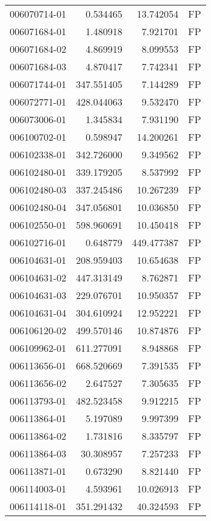 \begin{tabular}{lrrl}
006070714-01 &    0.534465 &    13.742054 &   FP \\
006071684-01 &    1.480918 &     7.921701 &   FP \\
006071684-02 &    4.869919 &     8.099553 &   FP \\
006071684-03 &    4.870417 &     7.742341 &   FP \\
006071744-01 &  347.551405 &     7.144289 &   FP \\
006072771-01 &  428.044063 &     9.532470 &   FP \\
006073006-01 &    1.345834 &     7.931190 &   FP \\
006100702-01 &    0.598947 &    14.200261 &   FP \\
006102338-01 &  342.726000 &     9.349562 &   FP \\
006102480-01 &  339.179205 &     8.537992 &   FP \\
006102480-03 &  337.245486 &    10.267239 &   FP \\
006102480-04 &  347.056801 &    10.036850 &   FP \\
006102550-01 &  598.960691 &    10.450418 &   FP \\
006102716-01 &    0.648779 &   449.477387 &   FP \\
006104631-01 &  208.959403 &    10.654638 &   FP \\
006104631-02 &  447.313149 &     8.762871 &   FP \\
006104631-03 &  229.076701 &    10.950357 &   FP \\
006104631-04 &  304.610924 &    12.952221 &   FP \\
006106120-02 &  499.570146 &    10.874876 &   FP \\
006109962-01 &  611.277091 &     8.948868 &   FP \\
006113656-01 &  668.520669 &     7.391535 &   FP \\
006113656-02 &    2.647527 &     7.305635 &   FP \\
006113793-01 &  482.523458 &     9.912215 &   FP \\
006113864-01 &    5.197089 &     9.997399 &   FP \\
006113864-02 &    1.731816 &     8.335797 &   FP \\
006113864-03 &   30.308957 &     7.257233 &   FP \\
006113871-01 &    0.673290 &     8.821440 &   FP \\
006114003-01 &    4.593961 &    10.026913 &   FP \\
006114118-01 &  351.291432 &    40.324593 &   FP \\

\end{tabular}
